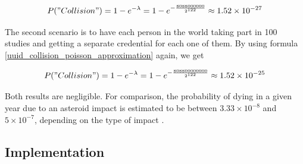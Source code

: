 \documentclass{report}
\begin{document}
	$$P("Collision")=1-e^{-\lambda}=1-e^{-\frac{8088000000}{2^{122}}} \approx 1.52 \times 10^{-27}$$

The second scenario is to have each person in the world taking part in 100 studies and getting a separate credential for each one of them. By using formula
\ref{uuid_collision_poisson_approximation} again, we get

$$P("Collision")=1-e^{-\lambda}=1-e^{-\frac{808800000000}{2^{122}}} \approx 1.52 \times 10^{-25}$$ 

Both results are negligible. For comparison, the probability of dying in a given year due to an asteroid impact is estimated to be between $3.33 \times 10^{-8}$ and $5 \times
10^{-7}$, depending on the type of impact \cite{death-by-asteroid}.

\subsection{Implementation} 
\end{document}
